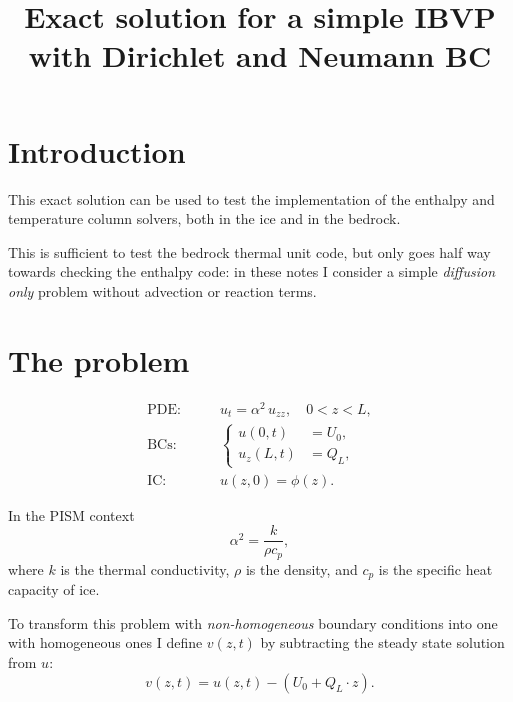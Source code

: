 \documentclass{article}
\begin{document}
\title{Exact solution for a simple IBVP with Dirichlet and Neumann BC}
\maketitle

\section{Introduction}
\label{sec:introduction}

This exact solution can be used to test the implementation of the
enthalpy and temperature column solvers, both in the ice and in the
bedrock.

This is sufficient to test the bedrock thermal unit code, but only
goes half way towards checking the enthalpy code: in these notes I
consider a simple \emph{diffusion only} problem without advection or
reaction terms.

\section{The problem}
\label{sec:problem}

\begin{align}
  \label{eq:1}
  \text{PDE:} \qquad & u_{t} = \alpha^{2}\, u_{zz},\quad 0 < z < L,\\
  \label{eq:2}
  \text{BCs:} \qquad &\left\{
                       \begin{aligned}
                         u(0,t) &= U_{0},\\
                         u_{z}(L,t) &= Q_{L},
                       \end{aligned}\right.\\
  \label{eq:3}
  \text{IC:} \qquad & u(z,0) = \phi(z).
\end{align}

In the PISM context
\begin{equation}
  \label{eq:14}
  \alpha^{2} = \frac{k}{\rho c_{p}},
\end{equation}
where $k$ is the thermal conductivity, $\rho$ is the density, and
$c_{p}$ is the specific heat capacity of ice.

To transform this problem with \emph{non-homogeneous} boundary conditions
into one with homogeneous ones I define $v(z,t)$ by subtracting the
steady state solution from $u$:
\begin{equation}
  \label{eq:4}
  v(z,t) = u(z,t) - \left( U_{0} + Q_{L}\cdot z \right).
\end{equation}
\end{document}
